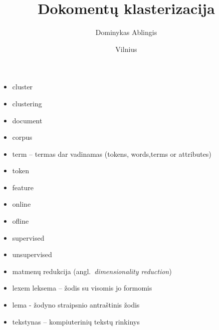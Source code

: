 \documentclass{VUMIFInfKursinis}
\title{Dokomentų klasterizacija}
\author{Dominykas Ablingis}
\date{Vilnius \\ \the\year}
\newif\iffast{} %
\begin{document}
\iffast{}
	\newcommand{\rewrite}[1]{\todo[linecolor=red,backgroundcolor=red!25,bordercolor=red]{#1}}
	\newcommand{\needsource}[1]{\todo[linecolor=blue,backgroundcolor=blue!25,bordercolor=blue,]{#1}}
	\newcommand{\toadd}[1]{\todo[linecolor=OliveGreen,backgroundcolor=OliveGreen!25,bordercolor=OliveGreen,]{#1}}
	\newcommand{\note}[1]{\todo[linecolor=Plum,backgroundcolor=Plum!25,bordercolor=Plum]{#1}}
	\newcommand{\thiswillnotshow}[1]{\todo[disable]{#1}}
	\listoftodos[Notes]
\else
	\newcommand{\rewrite}[1]{}
	\newcommand{\needsource}[1]{}
	\newcommand{\toadd}[1]{}
	\newcommand{\note}[1]{}
	\newcommand{\thiswillnotshow}[1]{}
\fi

\maketitle
\tableofcontents


\newcommand{\ltang}[2]{#1 (angl.\  \textit{#2}) }
\newcommand{\BigO}[1]{$\mathcal{O}(#1)$}

	\begin{itemize}
		\item cluster
		\item clustering
		\item document
		\item corpus
		\item term – termas dar vadinamas (tokens, words,terms or attributes)
		\item token
		\item feature
		\item online
		\item ofline
		\item supervised
		\item unsupervised
		\item \ltang{matmenų redukcija}{dimensionality reduction}
		\item lexem leksema – žodis su visomis jo formomis
		\item lema - žodyno straipsnio antraštinis žodis
		\item tekstynas – kompiuterinių tekstų rinkinys \toadd{nukopijuok}
	\end{itemize}
\end{document}
